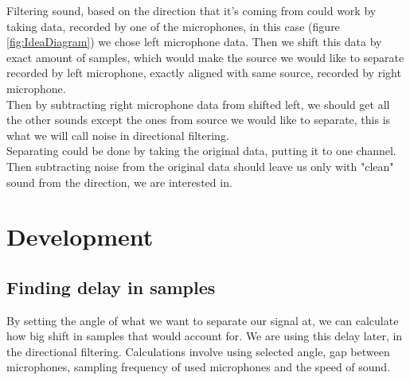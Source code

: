 Filtering sound, based on the direction that it's coming from could work by taking data, recorded by one of the microphones, in this case (figure
\ref{fig:IdeaDiagram}) we chose left microphone data. Then we shift this data by exact amount of samples, which would make the source we would like 
to separate recorded by left microphone, exactly aligned with same source, recorded by right microphone.\\
Then by subtracting right microphone data from shifted left, we should get all the other sounds except the ones from source we would like to
separate, this is what we will call noise in directional filtering.\\
Separating could be done by taking the original data, putting it to one channel. Then subtracting noise from the original data should leave us only
with "clean" sound from the direction, we are interested in.\\
\section{Development}
\subsection{Finding delay in samples}
By setting the angle of what we want to separate our signal at, we can calculate how big shift in samples that would account for. We are using this 
delay later, in the directional filtering. Calculations involve using selected angle, gap between microphones, sampling frequency of used 
microphones and the 
speed of sound. \\
